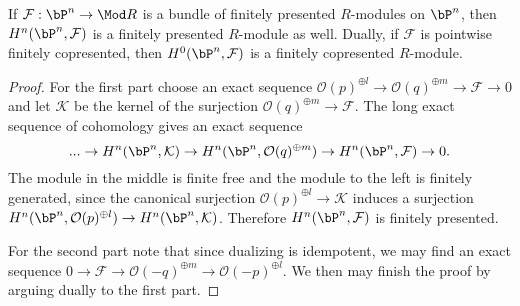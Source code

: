 \begin{corollary}
  If $\mathcal F : \bP^n \to \Mod R$ is a bundle of finitely presented $R$-modules on $\bP^n$, then $H^n(\bP^n, \mathcal F)$ is a finitely presented $R$-module as well.
  Dually, if $\mathcal F$ is pointwise finitely copresented, then $H^0(\bP^n, \mathcal F)$ is a finitely copresented $R$-module.
\end{corollary}

\begin{proof}
  For the first part choose an exact sequence $\mathcal O(p)^{\oplus l}\to \mathcal O(q)^{\oplus m}\to \mathcal F\to 0$ and let $\mathcal K$ be the kernel of the surjection $\mathcal O(q)^{\oplus m}\to \mathcal F$.
  The long exact sequence of cohomology gives an exact sequence
  \[
    ... \to H^n(\bP^n,\mathcal K) \to H^n(\bP^n, \mathcal O(q)^{\oplus m}) \to H^n(\bP^n,\mathcal F) \to 0.
  \]
  The module in the middle is finite free and the module to the left is finitely generated,  since the canonical surjection $\mathcal O(p)^{\oplus l} \to \mathcal K$ induces a surjection $H^n(\bP^n, \mathcal O(p)^{\oplus l}) \to H^n(\bP^n, \mathcal K)$.
  Therefore $H^n(\bP^n, \mathcal F)$ is finitely presented.

  For the second part note that since dualizing is idempotent, we may find an exact sequence $0 \to \mathcal F \to \mathcal O(-q)^{\oplus m} \to \mathcal O(-p)^{\oplus l}$. We then may finish the proof by arguing dually to the first part.
\end{proof}
